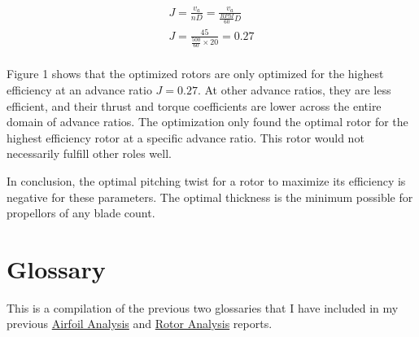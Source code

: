 \documentclass{article}
\begin{document}
\begin{equation}
\begin{aligned}
	J = \frac{v_{a}}{nD} = \frac{v_{a}}{\frac{RPM}{60}D} \\
	J = \frac{45}{\frac{500}{60} \times 20} = 0.27 \\
\end{aligned}
\end{equation} 

Figure 1 shows that the optimized rotors are only optimized for the highest efficiency at an advance ratio $J = 0.27$. At other advance ratios, they are less efficient, and their thrust and torque coefficients are lower across the entire domain of advance ratios. The optimization only found the optimal rotor for the highest efficiency rotor at a specific advance ratio. This rotor would not necessarily fulfill other roles well. \newline

In conclusion, the optimal pitching twist for a rotor to maximize its efficiency is negative for these parameters. The optimal thickness is the minimum possible for propellors of any blade count. \newline

\clearpage

\section{Glossary}

This is a compilation of the previous two glossaries that I have included in my previous \href{https://github.com/JoeSpencer1/497R-Projects/blob/Rotor-Analysis/Airfoil Analysis/Airfoil_Analysis.pdf}{Airfoil Analysis} and \href{https://github.com/JoeSpencer1/497R-Projects/blob/Rotor-Analysis/Rotor Analysis/Rotor_Analysis.pdf}{Rotor Analysis} reports.
\end{document}
